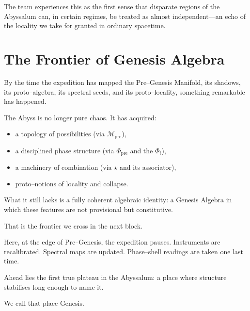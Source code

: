 The team experiences this as the first sense that disparate regions of the Abyssalum can, in
certain regimes, be treated as almost independent—an echo of the locality we take for granted in
ordinary spacetime.

\section{The Frontier of Genesis Algebra}
By the time the expedition has mapped the Pre–Genesis Manifold, its shadows, its proto–algebra,
its spectral seeds, and its proto–locality, something remarkable has happened.

The Abyss is no longer pure chaos.
It has acquired:
\begin{itemize}
  \item a topology of possibilities (via $\mathcal{M}_\mathrm{pre}$),
  \item a disciplined phase structure (via $\Phi_\mathrm{pre}$ and the $\Phi_i$),
  \item a machinery of combination (via $\star$ and its associator),
  \item proto–notions of locality and collapse.
\end{itemize}

What it still lacks is a fully coherent algebraic identity: a Genesis Algebra in which these
features are not provisional but constitutive.

That is the frontier we cross in the next block.

Here, at the edge of Pre–Genesis, the expedition pauses. Instruments are recalibrated. Spectral
maps are updated. Phase–shell readings are taken one last time.

Ahead lies the first true plateau in the Abyssalum: a place where structure stabilises long
enough to name it.

We call that place Genesis.
